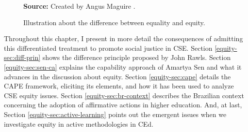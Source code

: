 \begin{figure}[ht!]
\centering

\caption{\textmd{Illustration about the difference between equality and equity.}}
\label{fig:equality-vs-equity}

\par\medskip\ABNTEXfontereduzida\selectfont\textbf{Source:} Created by Angus Maguire \cite{maguire:2016}.%
\end{figure}

Throughout this chapter, I present in more detail the consequences of admitting this differentiated treatment to promote social justice in \gls{CSE}. Section \ref{equity-sec:diff-prin} shows the difference principle proposed by John Rawls. Section \ref{equity-sec:sen-ca} explains the capability approach of Amartya Sen and what it advances in the discussion about equity. Section \ref{equity-sec:cape} details the \gls{CAPE} framework, eliciting its elements, and how it has been used to analyze \gls{CSE} equity issues. Section \ref{equity-sec:br-context} describes the Brazilian context concerning the adoption of affirmative actions in higher education. And, at last, Section \ref{equity-sec:active-learning} points out the emergent issues when we investigate equity in active methodologies in \gls{CEd}.
